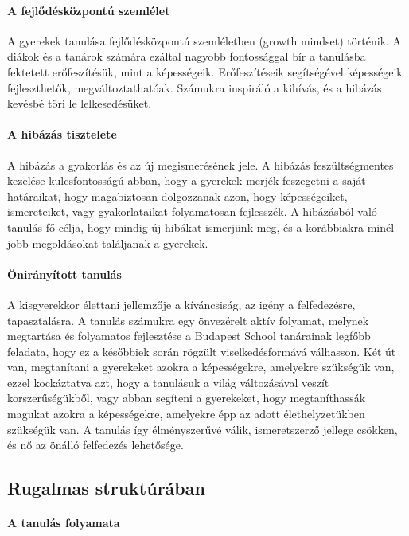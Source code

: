 \paragraph{A fejlődésközpontú szemlélet}

A gyerekek tanulása fejlődésközpontú szemléletben (growth mindset)
történik. A diákok és a tanárok számára ezáltal nagyobb fontossággal
bír a tanulásba fektetett erőfeszítésük, mint a képességeik.
Erőfeszítéseik segítségével képességeik fejleszthetők,
megváltoztathatóak. Számukra inspiráló a kihívás, és a hibázás kevésbé
töri le lelkesedésüket.

\paragraph{A hibázás tisztelete}

A hibázás a gyakorlás és az új megismerésének jele. A hibázás
feszültségmentes kezelése kulcsfontosságú abban, hogy a gyerekek merjék
feszegetni a saját határaikat, hogy magabiztosan dolgozzanak azon, hogy
képességeiket, ismereteiket, vagy gyakorlataikat folyamatosan
fejlesszék. A hibázásból való tanulás fő célja, hogy mindig új hibákat
ismerjünk meg, és a korábbiakra minél jobb megoldásokat találjanak a
gyerekek.


\paragraph{Önirányított
      tanulás}

A kisgyerekkor élettani jellemzője a kíváncsiság, az igény a
felfedezésre, tapasztalásra. A tanulás számukra egy önvezérelt aktív
folyamat, melynek megtartása és folyamatos fejlesztése a Budapest School
tanárainak legfőbb feladata, hogy ez a későbbiek során rögzült
viselkedésformává válhasson. Két út van, megtanítani a gyerekeket azokra
a képességekre, amelyekre szükségük van, ezzel kockáztatva azt, hogy a
tanulásuk a világ változásával veszít korszerűségükből, vagy abban
segíteni a gyerekeket, hogy megtaníthassák magukat azokra a
képességekre, amelyekre épp az adott élethelyzetükben szükségük van. A
tanulás így élményszerűvé válik, ismeretszerző jellege csökken, és nő az
önálló felfedezés lehetősége.

\subsection{Rugalmas struktúrában}
\paragraph{A tanulás folyamata}

